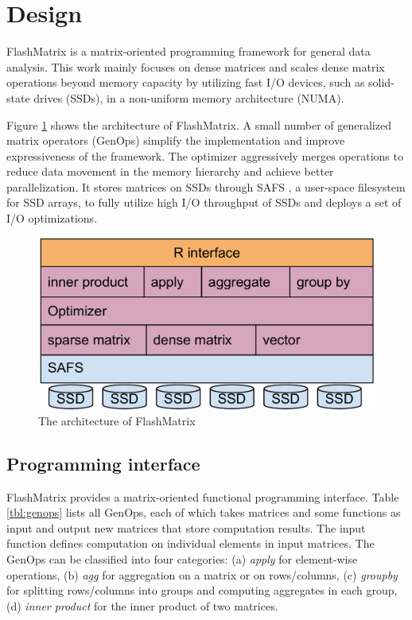 \section{Design}

FlashMatrix is a matrix-oriented programming framework for general data analysis.
This work mainly focuses on dense matrices and scales dense matrix operations
beyond memory capacity by utilizing fast I/O devices, such as solid-state drives
(SSDs), in a non-uniform memory architecture (NUMA).

Figure \ref{fig:arch} shows the architecture of FlashMatrix. 
A small number of generalized matrix operators (GenOps)
 simplify the implementation and improve expressiveness of
the framework. The optimizer aggressively merges operations to
reduce data movement in the memory hierarchy and achieve better parallelization.
It stores matrices on SSDs through SAFS \cite{safs},
a user-space filesystem for SSD arrays, to fully utilize high I/O
throughput of SSDs and deploys a set of I/O optimizations.

\begin{figure}
\centering
\includegraphics[scale=0.3]{FlashMatrix_figs/architecture.pdf}
\caption{The architecture of FlashMatrix}
\label{fig:arch}
\end{figure}

\subsection{Programming interface}

FlashMatrix provides a matrix-oriented functional programming interface.
Table \ref{tbl:genops} lists all GenOps, each of which takes matrices and
some functions as input and output new matrices that store computation results.
The input function defines computation on individual elements in input matrices.
The GenOps can be classified into four categories: (a) \textit{apply} for
element-wise operations, (b) \textit{agg} for aggregation on a matrix
or on rows/columns, (c) \textit{groupby} for splitting rows/columns
into groups and computing aggregates in each group,
(d) \textit{inner product} for the inner product of two matrices.

